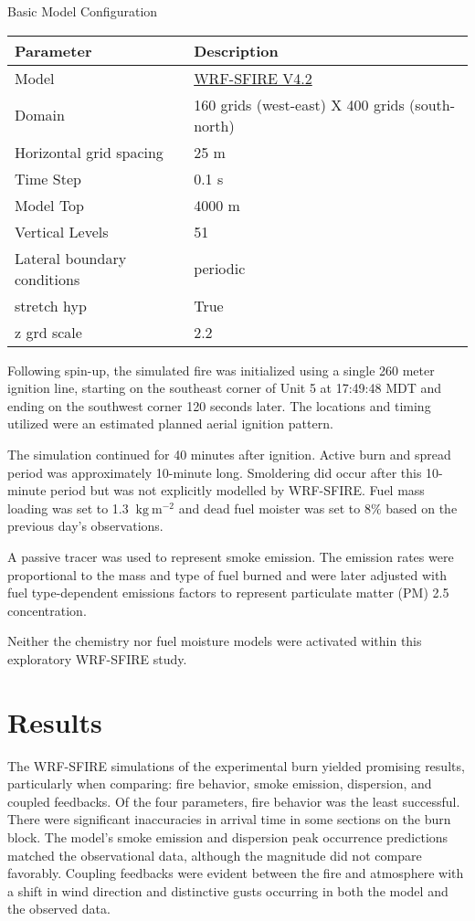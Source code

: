\documentclass[preprints,article,accept,moreauthors,pdftex]{Definitions/mdpi}
\begin{document}
\begin{specialtable}[H]
\centering
\caption{Basic Model Configuration\label{tab1}}
\begin{tabular}{ll}
\toprule
\textbf{Parameter}	& \textbf{Description}\\
\midrule
 Model		& \href{https://github.com/openwfm/WRF-SFIRE/tree/a2c3118f08ce424885705e9155b127ea28879f8b}{WRF-SFIRE V4.2}\\
 Domain		& 160 grids (west-east) X 400 grids (south-north)\\
 Horizontal grid spacing		& 25 m\\
 Time Step	& 0.1 s\\
 Model Top		& 4000 m\\
 Vertical Levels		& 51\\
 Lateral boundary conditions	& periodic\\
 stretch hyp & True\\
 z grd scale & 2.2\\
\bottomrule
\end{tabular}
\end{specialtable}

Following spin-up, the simulated fire was initialized using a single 260 meter ignition line, starting on the southeast corner of Unit 5 at 17:49:48 MDT and ending on the southwest corner 120 seconds later. The locations and timing utilized were an estimated planned aerial ignition pattern.

The simulation continued for 40 minutes after ignition. Active burn and spread period was approximately 10-minute long. Smoldering did occur after this 10-minute period but was not explicitly modelled by WRF-SFIRE. Fuel mass loading was set to 1.3 $\mathrm{~kg}\mathrm{~m}^{-2}$ and dead fuel moister was set to 8$\%$ based on the previous day’s observations.

A passive tracer was used to represent smoke emission. The emission rates were proportional to the mass and type of fuel burned and were later adjusted with fuel type-dependent emissions factors to represent particulate matter (PM) 2.5 concentration.

Neither the chemistry nor fuel moisture models were activated within this exploratory WRF-SFIRE study.
\section{Results}

The WRF-SFIRE simulations of the experimental burn yielded promising results, particularly when comparing: fire behavior, smoke emission, dispersion, and coupled feedbacks. Of the four parameters, fire behavior was the least successful. There were significant inaccuracies in arrival time in some sections on the burn block. The model’s smoke emission and dispersion peak occurrence predictions matched the observational data, although the magnitude did not compare favorably.
Coupling feedbacks were evident between the fire and atmosphere with a shift in wind direction and distinctive gusts occurring in both the model and the observed data.
\end{document}
